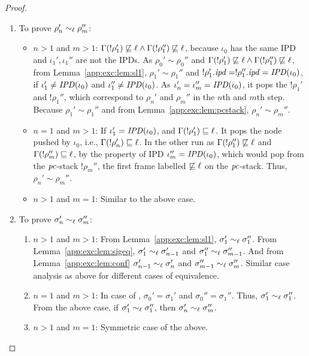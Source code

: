 \begin{proof}
\begin{enumerate}
  \item To prove $\rho_n' \sim_\ell \rho_m''$: 
    \begin{itemize}
      \item $n > 1$ and $m > 1$: $\Gamma(!\rho_1') \not\sqsubseteq
        \ell \wedge \Gamma(!\rho_1'') \not\sqsubseteq \ell$, because
        $\iota_0$ has the same IPD and $\iota_1',\iota_1''$ are not
        the IPDs. As $\rho_0' \sim \rho_0''$ and $\Gamma(!\rho_1')
        \not\sqsubseteq \ell \wedge \Gamma(!\rho_1'') \not\sqsubseteq \ell$, 
        from Lemma~\ref{app:exc:lem:sl1}, 
        $\rho_1' \sim \rho_1''$ and $!\rho_1'.\mathit{ipd} = !\rho_1''.\mathit{ipd} =
        \mathit{IPD}(\iota_0)$, if $\iota_1' \neq \mathit{IPD}(\iota_0)$ and $\iota_1''
        \neq \mathit{IPD}(\iota_0)$. As $\iota_n' = \iota_m'' = \mathit{IPD}(\iota_0)$, it pops
        the $!\rho_1'$ and $!\rho_1''$, which correspond to $\rho_n'$ and $\rho_m''$ in
        the $n$th and $m$th step. 
        Because $\rho_1' \sim \rho_1''$ and from
        Lemma~\ref{app:exc:lem:pcstack}, $\rho_n' \sim \rho_m''$.
      \item $n = 1$ and $m > 1$: If $\iota_1' =
        \mathit{IPD}(\iota_0)$, and $\Gamma(!\rho_1') \sqsubseteq \ell$. 
        It pops the node pushed by $\iota_0$, i.e., $\Gamma(!\rho_n')
        \sqsubseteq \ell$. In the other run as
        $\Gamma(!\rho_1'') \not\sqsubseteq \ell$ and $\Gamma(!\rho_m'')
        \sqsubseteq \ell$, by the property of IPD $\iota_m'' =
        \mathit{IPD}(\iota_0)$, which would pop from the $\mathit{pc}$-stack $!\rho_m''$,
        the first frame labelled $\not\sqsubseteq \ell$ on the
        $\mathit{pc}$-stack. Thus, $\rho_n' \sim \rho_m''$. 
       \item $n > 1$ and $m = 1$: Similar to the above case. 
       \end{itemize}
     \item To prove $\sigma_n' \sim_\ell \sigma_m''$: 
       \begin{enumerate}
       \item $n > 1$ and $m > 1$: 
         From Lemma~\ref{app:exc:lem:sl1}, $\sigma_1' \sim_\ell
         \sigma_1''$. From Lemma~\ref{app:exc:lem:sigeq}, $\sigma_1'
         \sim_\ell \sigma_{n-1}'$ and $\sigma_1''
         \sim_\ell \sigma_{m-1}''$. And from Lemma~\ref{app:exc:lem:conf}
         $\sigma_{n-1}' \sim_\ell \sigma_n'$ and $\sigma_{m-1}''
         \sim_\ell \sigma_m''$. Similar case analysis as above for
         different cases of equivalence. 
       \item $n = 1$ and $m > 1$: In case of , $\sigma_0' =
         \sigma_1'$ and $\sigma_0'' = \sigma_1''$. Thus, $\sigma_1' \sim_\ell
         \sigma_1''$. From the above case, if  $\sigma_1' \sim_\ell
        \sigma_1''$, then  $\sigma_n' \sim_\ell \sigma_m''$.
      \item $n > 1$ and $m = 1$: Symmetric case of the above. 
      \end{enumerate}
   
    \end{enumerate}
  
\end{proof}

